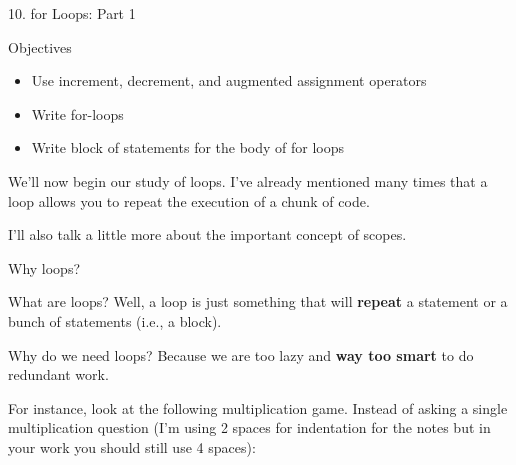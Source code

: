 \documentclass[
]{article}
\author{}
\date{}
\providecommand{\tightlist}{%
  \setlength{\itemsep}{0pt}\setlength{\parskip}{0pt}}
\begin{document}
10. for Loops: Part 1

Objectives

\begin{itemize}
\tightlist
\item
  Use increment, decrement, and augmented assignment operators
\item
  Write for-loops
\item
  Write block of statements for the body of for loops
\end{itemize}

We'll now begin our study of loops. I've already mentioned many times
that a loop allows you to repeat the execution of a chunk of code.

I'll also talk a little more about the important concept of scopes.

Why loops?

What are loops? Well, a loop is just something that will \textbf{repeat}
a statement or a bunch of statements (i.e., a block).

Why do we need loops? Because we are too lazy and \textbf{way too smart}
to do redundant work.

For instance, look at the following multiplication game. Instead of
asking a single multiplication question (I'm using 2 spaces for
indentation for the notes but in your work you should still use 4
spaces):
\end{document}
